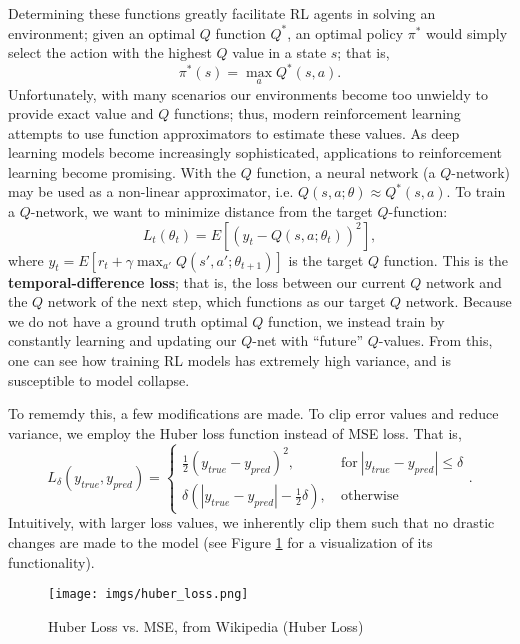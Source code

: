 \documentclass{article} %
\begin{document}
Determining these functions greatly facilitate RL agents in solving an environment; given an optimal
$Q$ function $Q^*$, an optimal policy $\pi^*$ would simply select the action with the highest $Q$
value in a state $s$; that is, \[
  \pi^*(s)=\max_a Q^*(s,a)
.\] Unfortunately, with many scenarios our environments become too unwieldy to provide exact value
and $Q$ functions; thus, modern reinforcement learning attempts to use function approximators to
estimate these values. As deep learning models become increasingly sophisticated, applications to
reinforcement learning become promising. With the $Q$ function, a neural network (a $Q$-network) may
be used as a non-linear approximator, i.e. $Q(s, a; \theta)\approx Q^*(s,a)$. To train a
$Q$-network, we want to minimize distance from the target $Q$-function: \[
  L_t(\theta_t)=E[(y_t-Q(s,a;\theta_t))^2]
,\] where $y_t=E[r_t+\gamma\max_{a'} Q(s',a';\theta_{t+1})]$ is the target $Q$ function. This is the
\textbf{temporal-difference loss}; that is, the loss between our current $Q$ network and the $Q$
network of the next step, which functions as our target $Q$ network. Because we do not have a ground
truth optimal $Q$ function, we instead train by constantly learning and updating our $Q$-net with
``future'' $Q$-values. From this, one can see how training RL models has extremely high variance,
and is susceptible to model collapse.

To rememdy this, a few modifications are made. To clip error values and reduce variance, we employ
the Huber loss function instead of MSE loss. That is, \[
  L_{\delta}(y_{true}, y_{pred})=\left\{\begin{array}{rl} \frac{1}{2}(y_{true}-y_{pred})^2, &
      ~\text{for}~ \left| y_{true}-y_{pred} \right|  \le \delta \\ \delta(\left| y_{true}-y_{pred}
      \right|-\frac{1}{2}\delta ), &~\text{otherwise}~\end{array}\right.
.\] Intuitively, with larger loss values, we inherently clip them such that no drastic changes are
made to the model (see Figure \ref{fig:imgs-huber_loss-png} for a visualization of its functionality). 

\begin{figure}
  \centering
  \texttt{[image: imgs/huber\_loss.png]}
  \caption{Huber Loss vs. MSE, from Wikipedia (Huber Loss)}
  \label{fig:imgs-huber_loss-png}
\end{figure}
\end{document}
